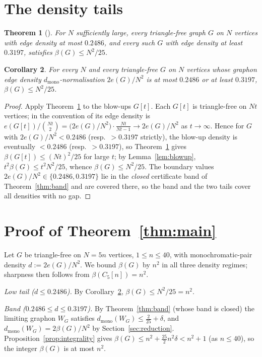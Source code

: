 \documentclass[11pt]{article}
\newtheorem{theorem}{Theorem}[section]
\newtheorem{corollary}[theorem]{Corollary}
\theoremstyle{remark}
\newcommand{\bip}{\beta}
\newcommand{\dmono}{d_{\mathrm{mono}}}
\begin{document}
\section{The density tails}\label{sec:tails}

\begin{theorem}[{\cite[Theorem 1.3]{BCL21}}]\label{thm:bcl}
For $N$ sufficiently large, every triangle-free graph $G$ on $N$ vertices with
edge density at most $0.2486$, and every such $G$ with edge density at least
$0.3197$, satisfies $\bip(G)\le N^2/25$.
\end{theorem}

\begin{corollary}\label{cor:tails}
For \emph{every} $N$ and every triangle-free $G$ on $N$ vertices whose
\emph{graphon} edge density $\dmono$-normalisation $2e(G)/N^2$ is at most $0.2486$
or at least $0.3197$, $\bip(G)\le N^2/25$.
\end{corollary}

\begin{proof}
Apply Theorem~\ref{thm:bcl} to the blow-ups $G[t]$. Each $G[t]$ is triangle-free on
$Nt$ vertices; in the convention of \cite{BCL21} its edge density is
$e(G[t])/\binom{Nt}{2}=\bigl(2e(G)/N^2\bigr)\cdot\tfrac{Nt}{Nt-1}\to 2e(G)/N^2$ as
$t\to\infty$. Hence for $G$ with $2e(G)/N^2<0.2486$ (resp.\ $>0.3197$ strictly), the
blow-up density is eventually $<0.2486$ (resp.\ $>0.3197$), so Theorem~\ref{thm:bcl}
gives $\bip(G[t])\le (Nt)^2/25$ for large $t$; by Lemma~\ref{lem:blowup},
$t^2\bip(G)\le t^2N^2/25$, whence $\bip(G)\le N^2/25$. The boundary values
$2e(G)/N^2\in\{0.2486,0.3197\}$ lie in the \emph{closed} certificate band of
Theorem~\ref{thm:band} and are covered there, so the band and the two tails cover
all densities with no gap.
\end{proof}

\section{Proof of Theorem~\ref{thm:main}}\label{sec:closure}

Let $G$ be triangle-free on $N=5n$ vertices, $1\le n\le 40$, with monochromatic-pair
density $d:=2e(G)/N^2$. We bound $\bip(G)$ by $n^2$ in all three density regimes;
sharpness then follows from $\bip(C_5[n])=n^2$.

\smallskip\noindent\emph{Low tail ($d\le 0.2486$).} By Corollary~\ref{cor:tails},
$\bip(G)\le N^2/25=n^2$.

\smallskip\noindent\emph{Band ($0.2486\le d\le 0.3197$).} By
Theorem~\ref{thm:band} (whose band is closed) the limiting graphon $W_G$ satisfies
$\dmono(W_G)\le\tfrac2{25}+\delta$, and $\dmono(W_G)=2\bip(G)/N^2$ by
Section~\ref{sec:reduction}. Proposition~\ref{prop:integrality} gives
$\bip(G)\le n^2+\tfrac{25}{2}n^2\delta<n^2+1$ (as $n\le 40$), so the integer
$\bip(G)$ is at most $n^2$.
\end{document}
